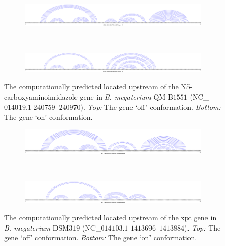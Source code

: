 \begin{figure}[!ht]
\centering
\begin{subfigure}[h]{\textwidth}
\centering
\includegraphics[width=.9\textwidth]{Figures/Ribofinder/NC_014019_1_240759_240970_OFF.pdf}
\end{subfigure} \\
\medskip
\begin{subfigure}[h]{\textwidth}
\centering
\includegraphics[width=.9\textwidth]{Figures/Ribofinder/NC_014019_1_240759_240970_ON.pdf}
\end{subfigure}
\caption[Structures for the putative \rb located upstream of the N5- carboxy\-amino\-imidazole gene in {\em B. megaterium} QM B$1551$]{The computationally predicted \rb located upstream of the
N5- carboxy\-amino\-imidazole
gene in {\em B. megaterium} QM B$1551$ (NC\_$014019.1$ $240759$--$240970$).
{\em Top:} The gene `off' conformation. {\em Bottom:} The gene `on' conformation.}
\label{fig:figure:NC_014019_1_240759_240970}
\end{figure}
\medskip

\begin{figure}[!ht]
\centering
\begin{subfigure}[h]{\textwidth}
\centering
\includegraphics[width=.9\textwidth]{Figures/Ribofinder/NC_014103_1_1413696_1413884_OFF.pdf}
\end{subfigure} \\
\medskip
\begin{subfigure}[h]{\textwidth}
\centering
\includegraphics[width=.9\textwidth]{Figures/Ribofinder/NC_014103_1_1413696_1413884_ON.pdf}
\end{subfigure}
\caption[Structures for the putative \rb located upstream of the xpt gene in {\em B. megaterium} DSM$319$]{The computationally predicted \rb located upstream of the xpt
gene in {\em B. megaterium} DSM$319$ (NC\_$014103.1$ $1413696$--$1413884$).
{\em Top:} The gene `off' conformation. {\em Bottom:} The gene `on' conformation.}
\label{fig:figure:NC_014103_1_1413696_1413884}
\end{figure}
\medskip

